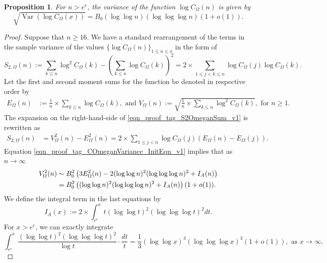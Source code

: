 \documentclass[11pt,reqno,a4letter]{article}
\numberwithin{equation}{section}
\numberwithin{figure}{section}
\numberwithin{table}{section}
\theoremstyle{plain}
\newtheorem{prop}[theorem]{Proposition}
\numberwithin{theorem}{section}
\theoremstyle{definition}
\begin{document}
\begin{prop}
\label{prop_VarianceStat_for_COmegan_v1}
\label{prop_COmeganFunc_Variance_v1}
For $n > e^e$, the variance of the function $\log C_{\Omega}(n)$ is given by
\[
\sqrt{\operatorname{Var}\left(\log C_{\Omega}(x)\right)} = 
	B_0 (\log\log n) (\log\log\log n) \left(1 + o(1)\right). 
\]
\end{prop}
\begin{proof}
Suppose that $n \geq 16$. 
We have a standard rearrangement of the terms in the sample variance of 
the values $\{\log C_{\Omega}(n)\}_{1 \leq n \leq x}$ in the form of 
\begin{equation}
\label{eqn_proof_tag_S2OmeganSum_v1}
S_{2,\Omega}(n) := \sum_{k \leq n} \log^2 C_{\Omega}(k) - 
     \left(\sum_{k \leq n} \log C_{\Omega}(k)\right)^2 = 
	2 \times \sum_{1 \leq j < k \leq n} \log C_{\Omega}(j) \log C_{\Omega}(k).
\end{equation}
Let the first and second moment sums for the function 
be denoted in respective order by 
\begin{align*}
E_{\Omega}(n) & := \frac{1}{n} \times \sum_{k \leq n} \log C_{\Omega}(k), 
     \text{ and } 
V_{\Omega}(n) := \sqrt{\frac{1}{n} \times \sum_{k \leq n} \log^2 C_{\Omega}(k)}, 
	\text{ for } n \geq 1. 
\end{align*}
The expansion on the right-hand-side of \eqref{eqn_proof_tag_S2OmeganSum_v1} is rewritten as 
\begin{align}
\label{eqn_proof_tag_COmeganVariance_InitEqn_v1}
S_{2,\Omega}(n) & = V_{\Omega}^2(n) - E_{\Omega}^2(n) = 
     2 \times \sum_{1 \leq j < n} \log C_{\Omega}(j) \left(
     E_{\Omega}(n) - E_{\Omega}(j)\right). 
\end{align} 
Equation \eqref{eqn_proof_tag_COmeganVariance_InitEqn_v1} implies that as $n \rightarrow \infty$ 
\begin{align}
\notag
V_{\Omega}^2(n) & \sim B_0^2 \left(3E_{\Omega}^2(n) - 
	2 (\log\log n)^2 (\log\log\log n)^2 + I_A(n)\right) \\ 
\label{eqn_proof_tag_COmeganVariance_InitEqn_v2}
	& =  B_0^2 \left((\log\log n)^2 (\log\log\log n)^2 + I_A(n)\right) (1+o(1)). 
\end{align} 
We define the integral term in the last equations by 
\[
I_A(x) := 2 \times \int_{e^e}^x t (\log\log t)^2 (\log\log\log t)^2 dt. 
\]
For $x > e^e$, we can exactly integrate 
\[
\int_{e^e}^x \frac{(\log\log t)^2 (\log\log\log t)^2}{\log t} \cdot \frac{dt}{t} = 
	\frac{1}{3} (\log\log x)^3 (\log\log\log x)^3 (1+o(1)), 
	\text{ as } x \rightarrow \infty. 
\]
\end{proof}
\end{document}
